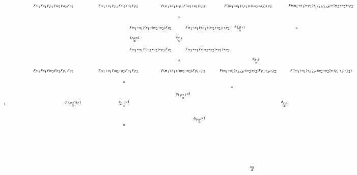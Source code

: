 \documentclass[reqno]{amsart}
\begin{document}
\[
\begin{tikzpicture}[scale=1.6]
\node () at (7.625,-2) {$\scriptscriptstyle{\stackrel{\alpha_\otimes} \cong}$};
\node () at (2.1,0) {$\scriptscriptstyle{\stackrel{(1 \times \mu \times 1) \times 1} \cong}$};
\node () at (3.675,0) {$\scriptscriptstyle{\stackrel{\phi_{\beta,1} \times 1} \cong}$};
\node () at (3.675,0.66) {$\scriptscriptstyle{\cong}$};
\node () at (3.675,-.66) {$\scriptscriptstyle{\cong}$};
\node () at (5.5,.25) {$\scriptscriptstyle{\stackrel{\phi_{1,\beta+1} \times 1} \cong}$};
\node () at (8.625,0) {$\scriptscriptstyle{\stackrel{\phi_{\chi,1}} \cong}$};
\node () at (6,-.5) {$\scriptscriptstyle{\stackrel{\phi_{\psi,\psi} \times 1} \cong}$};
\node () at (7,.5) {$\scriptscriptstyle{\cong}$};
\node () at (4,2) {$\scriptscriptstyle{\stackrel{1 \times \mu \times 1} \cong}$};
\node () at (5.375,2) {$\scriptscriptstyle{\stackrel{\phi_{\beta,1}} \cong}$};
\node () at (5.375,2.66) {$\scriptscriptstyle{\cong}$};
\node () at (5.375,1.33) {$\scriptscriptstyle{\cong}$};
\node () at (7.75,1.33) {$\scriptscriptstyle{\stackrel{\phi_{\psi,\psi}} \cong}$};
\node () at (7.25,2.33) {$\scriptscriptstyle{\stackrel{\phi_{1,\beta+1}} \cong}$};
\node () at (9,2.33) {$\scriptscriptstyle{\cong}$};
\node (1) at (0,0) {$\scriptscriptstyle{\one}$};
\node (A) at (1.5,3) {$\scriptscriptstyle{Fm_1 Fn_1 Fp_1 Fm_2 Fn_2 Fp_2}$};
\node (A') at (3.5,3) {$\scriptscriptstyle{Fm_1+n_1 Fp_1 Fm_2+n_2 Fp_2}$};
\node (A'') at (5.5,3) {$\scriptscriptstyle{F(m_1+n_1)+p_1 F(m_2+n_2)+p_2}$};
\node (A''') at (7.5,3) {$\scriptscriptstyle{F((m_1+n_1)+p_1)+((m_2+n_2)+p_2}$};
\node (A'''') at (9.75,3) {$\scriptscriptstyle{F((m_1+n_1)+p_1)+_{(b+b')+b''}((m_2+n_2)+p_2}$};
\node (B) at (1.5,1) {$\scriptscriptstyle{Fm_1 Fn_1 Fm_2 Fn_2 Fp_1 Fp_2}$};
\node (B') at (3.5,1) {$\scriptscriptstyle{Fm_1+n_1 Fm_2+n_2 Fp_1 Fp_2}$};
\node (B'') at (5.5,1) {$\scriptscriptstyle{F(m_1+n_1)+(m_2+n_2) Fp_1+p_2}$};
\node (B''') at (7.5,1) {$\scriptscriptstyle{F(m_1+n_1)+_{b+b'}(m_2+n_2) Fp_1+_{b''}p_2}$};
\node (B'''') at (9.75,1) {$\scriptscriptstyle{F((m_1+n_1)+_{b+b'}(m_2+n_2))+(p_1+_{b''}p_2)}$};
\node (X) at (4.5,2.33) {$\scriptscriptstyle{Fm_1+n_1 Fp_1+(m_2+n_2) Fp_2}$};
\node (X') at (6.25,2.33) {$\scriptscriptstyle{Fm_1+n_1 F(p_1+(m_2+n_2))+p_2}$};
\node (X'') at (4.5,1.66) {$\scriptscriptstyle{Fm_1+n_1 F(m_2+n_2)+p_1 Fp_2}$};
\node (X''') at (6.25,1.66) {$\scriptscriptstyle{Fm_1+n_1 F((m_2+n_2)+p_1)+p_2}$};

\end{tikzpicture}\]
\end{document}
